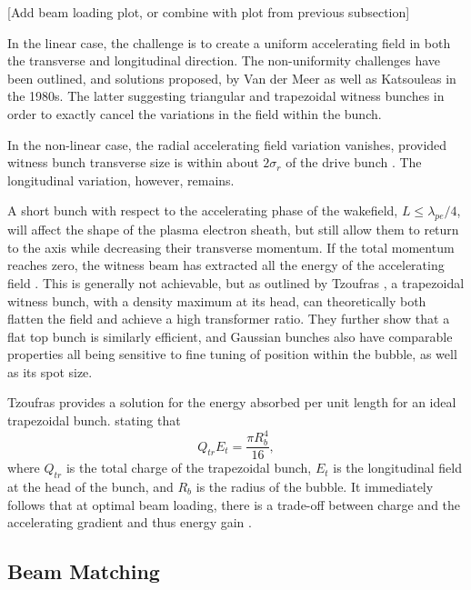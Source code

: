 [Add beam loading plot, or combine with plot from previous subsection]

In the linear case, the challenge is to create a uniform accelerating field in both the transverse and longitudinal direction. The non-uniformity challenges have been outlined, and solutions proposed, by Van der Meer \cite{van_der_meer:1985} as well as Katsouleas \etal \cite{katsouleas:1987} in the 1980s. The latter suggesting triangular and trapezoidal witness bunches in order to exactly cancel the variations in the field within the bunch.

In the non-linear case, the radial accelerating field variation vanishes, provided witness bunch transverse size is within about $2\sigma_{r}$ of the drive bunch \cite{rosenzweig:1991}. The longitudinal variation, however, remains.

A short bunch with respect to the accelerating phase of the wakefield, $L \leq \lambda_{pe}/4$, will affect the shape of the plasma electron sheath, but still allow them to return to the axis while decreasing their transverse momentum. If the total momentum reaches zero, the witness beam has extracted all the energy of the accelerating field \cite{lu:2006a,lu:2006}. This is generally not achievable, but as outlined by Tzoufras \etal \cite{tzoufras:2009}, a trapezoidal witness bunch, with a density maximum at its head, can theoretically both flatten the field and achieve a high transformer ratio. They further show that a flat top bunch is similarly efficient, and Gaussian bunches also have comparable properties \dash all being sensitive to fine tuning of position within the bubble, as well as its spot size.

Tzoufras \etal provides a solution for the energy absorbed per unit length for an ideal trapezoidal bunch. stating that
\begin{equation}
    Q_{tr}E_{t} = \frac{\pi R_{b}^{4}}{16}, \label{EQ:Trapez}
\end{equation}
where $Q_{tr}$ is the total charge of the trapezoidal bunch, $E_{t}$ is the longitudinal field at the head of the bunch, and $R_{b}$ is the radius of the bubble. It immediately follows that at optimal beam loading, there is a trade-off between charge and the accelerating gradient and thus energy gain \cite{tzoufras:2009}.

\subsection{Beam Matching}
\label{Int:BPI:Match}

